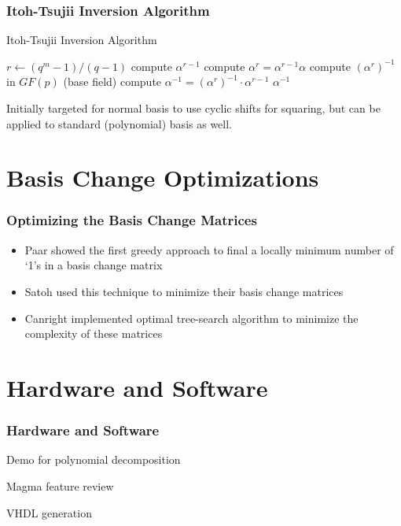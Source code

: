 \documentclass[handout]{beamer}
\begin{document}
\begin{frame}
	\frametitle{Itoh-Tsujii Inversion Algorithm}
\begin{algorithm}[H] 
\caption{Itoh-Tsujii Inversion Algorithm} 
\begin{algorithmic}[1]
\State $r \gets (q^m - 1)/(q-1)$
\State compute $\alpha^{r-1}$
\State compute $\alpha^r = \alpha^{r-1}\alpha$
\State compute $(\alpha^r)^{-1}$ in $GF(p)$ (base field)
\State compute $\alpha^{-1} = (\alpha^r)^{-1} \cdot \alpha^{r-1}$
\State \Return $\alpha^{-1}$
\end{algorithmic}
\end{algorithm}
\begin{center}
Initially targeted for normal basis to use cyclic shifts for squaring, but can be applied to standard (polynomial) basis as well.
\end{center}
\end{frame}

\section{Basis Change Optimizations}
\begin{frame}
	\frametitle{Optimizing the Basis Change Matrices}
	\begin{itemize}
		\item Paar showed the first greedy approach to final a locally minimum number of `1's in a basis change matrix 
		\item Satoh used this technique to minimize their basis change matrices
		\item Canright implemented optimal tree-search algorithm to minimize the complexity of these matrices
	\end{itemize}
\end{frame}

\section{Hardware and Software}
\begin{frame}
	\frametitle{Hardware and Software}
	\begin{center}
		Demo for polynomial decomposition

		\medskip

		Magma feature review

		\medskip

		VHDL generation
	\end{center}
\end{frame}
\end{document}
